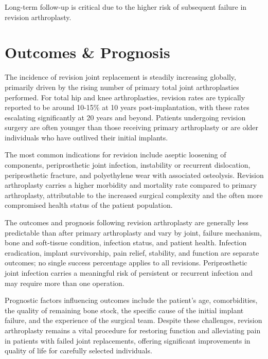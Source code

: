 Long-term follow-up is critical due to the higher risk of subsequent failure in revision arthroplasty.

\section*{Outcomes \& Prognosis}
The incidence of revision joint replacement is steadily increasing globally, primarily driven by the rising number of primary total joint arthroplasties performed. For total hip and knee arthroplasties, revision rates are typically reported to be around 10-15\% at 10 years post-implantation, with these rates escalating significantly at 20 years and beyond. Patients undergoing revision surgery are often younger than those receiving primary arthroplasty or are older individuals who have outlived their initial implants. 

The most common indications for revision include aseptic loosening of components, periprosthetic joint infection, instability or recurrent dislocation, periprosthetic fracture, and polyethylene wear with associated osteolysis. Revision arthroplasty carries a higher morbidity and mortality rate compared to primary arthroplasty, attributable to the increased surgical complexity and the often more compromised health status of the patient population.

The outcomes and prognosis following revision arthroplasty are generally less predictable than after primary arthroplasty and vary by joint, failure mechanism, bone and soft-tissue condition, infection status, and patient health. Infection eradication, implant survivorship, pain relief, stability, and function are separate outcomes; no single success percentage applies to all revisions. Periprosthetic joint infection carries a meaningful risk of persistent or recurrent infection and may require more than one operation.

Prognostic factors influencing outcomes include the patient's age, comorbidities, the quality of remaining bone stock, the specific cause of the initial implant failure, and the experience of the surgical team. Despite these challenges, revision arthroplasty remains a vital procedure for restoring function and alleviating pain in patients with failed joint replacements, offering significant improvements in quality of life for carefully selected individuals.

